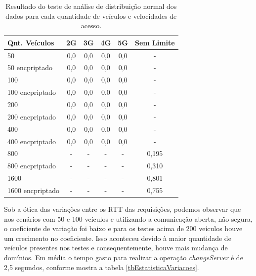 \documentclass[
	12pt,				%
	oneside,			%
	a4paper,			%
	english,			%
	brazil				%
	]{abntex2ppgsi}
\begin{document}
\begin{table}[!h]
	\centering
	\caption{Resultado do teste de análise de distribuição normal dos dados para cada quantidade de veículos e velocidades de acesso. }
	\label{tbEstatisticaKS}
	\begin{tabular}{|l|c|c|c|c|c|}
		\hline
		\rowcolor[gray]{0.7}
		Qnt. Veículos & 2G  & 3G  & 4G  & 5G & Sem Limite  \\ \hline
		\cellcolor[gray]{0.7}50              & 0,0 & 0,0 & 0,0 & 0,0& - \\ \hline
		\cellcolor[gray]{0.7}50 encpriptado             & 0,0 & 0,0 & 0,0 & 0,0& - \\ \hline
		\cellcolor[gray]{0.7}100             & 0,0 & 0,0 & 0,0 & 0,0& - \\ \hline
		\cellcolor[gray]{0.7}100 encpriptado            & 0,0 & 0,0 & 0,0 & 0,0& - \\ \hline
		\cellcolor[gray]{0.7}200             & 0,0 & 0,0 & 0,0 & 0,0& - \\ \hline
		\cellcolor[gray]{0.7}200 encpriptado            & 0,0 & 0,0 & 0,0 & 0,0& - \\ \hline
		\cellcolor[gray]{0.7}400             & 0,0 & 0,0 & 0,0 & 0,0& - \\ \hline
		\cellcolor[gray]{0.7}400 encpriptado            & 0,0 & 0,0 & 0,0 & 0,0& - \\ \hline
		\cellcolor[gray]{0.7}800             & - & - & - & - & 0,195 \\ \hline
		\cellcolor[gray]{0.7}800 encpriptado             & - & - & - & - & 0,310\\ \hline
		\cellcolor[gray]{0.7}1600            & - & - & - & -& 0,801 \\ \hline
		\cellcolor[gray]{0.7}1600 encpriptado            & - & - & - & -& 0,755 \\ \hline
	\end{tabular}
\end{table}

Sob a ótica das variações entre os RTT das requisições, podemos observar que nos cenários com 50 e 100 veículos e utilizando a comunicação aberta, não segura, o coeficiente de variação foi baixo e para os testes acima de 200 veículos houve um crecimento no coeficiente. Isso aconteceu devido à maior quantidade de veículos presentes nos testes e consequentemente, houve mais mudança de domínios. Em média o tempo gasto para realizar a operação \textit{changeServer} é de 2,5 segundos, conforme mostra a tabela \ref{tbEstatisticaVariacoes}.
\end{document}
